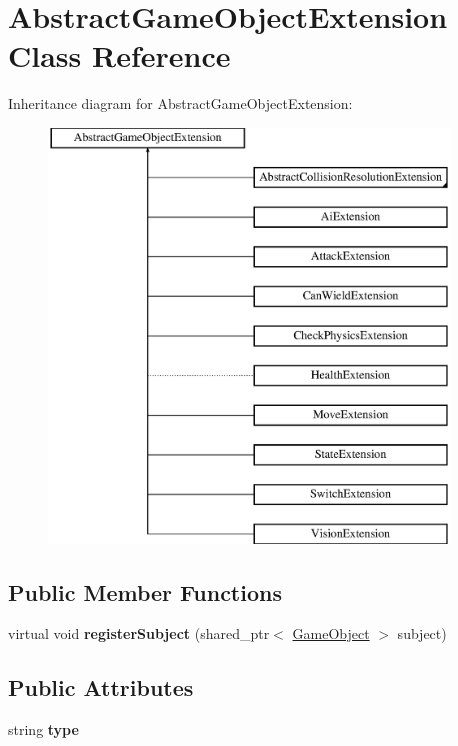 \hypertarget{class_abstract_game_object_extension}{}\section{Abstract\+Game\+Object\+Extension Class Reference}
\label{class_abstract_game_object_extension}
Inheritance diagram for Abstract\+Game\+Object\+Extension\+:\begin{figure}[H]
\begin{center}
\leavevmode
\includegraphics[height=11.000000cm]{class_abstract_game_object_extension}
\end{center}
\end{figure}
\subsection*{Public Member Functions}
\begin{DoxyCompactItemize}
\item 
\mbox{\label{class_abstract_game_object_extension_abaa841674842d2e85cb65413bbbf4fb1}} 
virtual void {\bfseries register\+Subject} (shared\+\_\+ptr$<$ \mbox{\hyperlink{class_game_object}{Game\+Object}} $>$ subject)
\end{DoxyCompactItemize}
\subsection*{Public Attributes}
\begin{DoxyCompactItemize}
\item 
\mbox{\label{class_abstract_game_object_extension_a75e13466dc5bb8809dc1c843776364df}} 
string {\bfseries type}
\end{DoxyCompactItemize}
